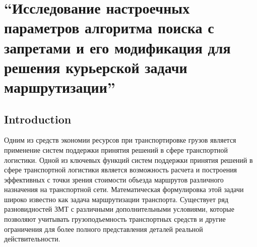 \documentclass[]{TAACpaper}
\begin{document}

\def\dd#1#2{\frac{\partial#1}{\partial#2}}
\section{
``Исследование  настроечных параметров алгоритма поиска с запретами и его модификация для решения курьерской задачи маршрутизации'' 
}



\subsection{Introduction}
Одним из средств экономии ресурсов при транспортировке грузов является применение систем поддержки принятия решений в сфере транспортной логистики. Одной из ключевых функций систем поддержки принятия решений в сфере транспортной логистики является возможность расчета и построения эффективных с точки зрения стоимости объезда маршрутов различного назначения на транспортной сети. Математическая формулировка этой задачи широко известно как задача маршрутизации транспорта. Существует ряд разновидностей ЗМТ с различными дополнительными условиями, которые позволяют учитывать грузоподъемность транспортных средств и другие ограничения для более полного представления деталей реальной действительности.
\end{document}

